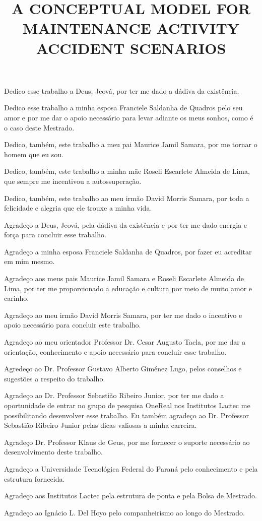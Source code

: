 \documentclass[openright]{normas-utf-tex} %
\title{\MakeUppercase{A Conceptual Model for Maintenance Activity Accident Scenarios}} %
\begin{document}
\capa %
\folhaderosto %




\begin{dedicatoria}
Dedico esse trabalho a Deus, Jeová, por ter me dado a dádiva da existência.

Dedico esse trabalho a minha esposa Franciele Saldanha de Quadros pelo seu amor e por me dar o apoio necessário para levar adiante os meus sonhos, como é o caso deste Mestrado. 

Dedico, também, este trabalho a meu pai Maurice Jamil Samara, por me tornar o homem que eu sou.

Dedico, também, este trabalho a minha mãe Roseli Escarlete Almeida de Lima, que sempre me incentivou a autossuperação.

Dedico, também, este trabalho ao meu irmão David Morris Samara, por toda a felicidade e alegria que ele trouxe a minha vida. 

\end{dedicatoria}

\begin{agradecimentos}
Agradeço a Deus, Jeová, pela dádiva da existência e por ter me dado energia e força para concluir esse trabalho. 

Agradeço a minha esposa Franciele Saldanha de Quadros, por fazer eu acreditar em mim mesmo. 

Agradeço aos meus pais Maurice Jamil Samara e Roseli Escarlete Almeida de Lima, por ter me proporcionado a educação e cultura por meio de muito amor e carinho.

Agradeço ao meu irmão David Morris Samara, por ter me dado o incentivo e apoio necessário para concluir este trabalho.

Agradeço ao meu orientador Professor Dr. Cesar Augusto Tacla, por me dar a orientação, conhecimento e apoio necessário para concluir esse trabalho. 

Agredeço ao Dr. Professor Gustavo Alberto Giménez Lugo, pelos conselhos e sugestões a respeito do trabalho. 

Agradeço ao Dr. Professor Sebastião Ribeiro Junior, por ter me dado a oportunidade de entrar no grupo de pesquisa OneReal nos Institutos Lactec me possibilitando desenvolver esse trabalho. Eu também agradeço ao Dr. Professor Sebastião Ribeiro Junior pelas dicas valiosas a minha carreira. 

Agradeço Dr. Professor Klaus de Geus, por me fornecer o suporte necessário ao desenvolvimento deste trabalho.  

Agradeço a Universidade Tecnológica Federal do Paraná pelo conhecimento e pela estrutura fornecida.

Agradeço aos Institutos Lactec pela estrutura de ponta e pela Bolsa de Mestrado.

Agradeço ao Ignácio L. Del Hoyo pelo companheirismo ao longo do Mestrado. 
\end{agradecimentos}
\end{document}
